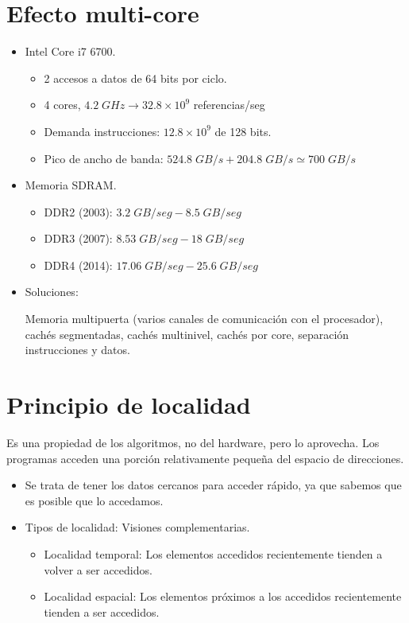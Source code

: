 \documentclass[12pt, twoside, openright]{report} %
\begin{document}
\section{Efecto multi-core}
\begin{itemize}
	\item Intel Core i7 6700.
	      \begin{itemize}
		      \item 2 accesos a datos de 64 bits por ciclo.
		      \item 4 cores, $4.2 \; GHz \rightarrow 32.8 \times 10^9$ referencias/seg
		      \item Demanda instrucciones: $12.8 \times 10^9$ de 128 bits.
		      \item Pico de ancho de banda: $524.8 \; GB/s + 204.8 \; GB/s \simeq 700 \; GB/s$
	      \end{itemize}


	\item Memoria SDRAM.
	      \begin{itemize}
		      \item DDR2 (2003): $3.2\; GB/seg - 8.5\; GB/seg$
		      \item DDR3 (2007): $8.53\; GB/seg - 18\; GB/seg$
		      \item DDR4 (2014): $17.06\; GB/seg - 25.6\; GB/seg$
	      \end{itemize}


	\item Soluciones:

	      Memoria multipuerta (varios canales de comunicación con el procesador), cachés segmentadas, cachés
	      multinivel, cachés por core, separación instrucciones y
	      datos.
\end{itemize}

\section{Principio de localidad}
Es una propiedad de los algoritmos, no del
hardware, pero lo aprovecha. Los programas acceden una porción
relativamente pequeña del espacio de direcciones.

\begin{itemize}

	\item Se trata de tener los datos cercanos para acceder rápido, ya que
	      sabemos que es posible que lo accedamos.
	\item Tipos de localidad: Visiones complementarias.

	      \begin{itemize}

		      \item Localidad temporal: Los elementos accedidos recientemente
		            tienden a volver a ser accedidos.
		      \item Localidad espacial: Los elementos próximos a los accedidos
		            recientemente tienden a ser accedidos.
	      \end{itemize}
\end{itemize}
\end{document}
